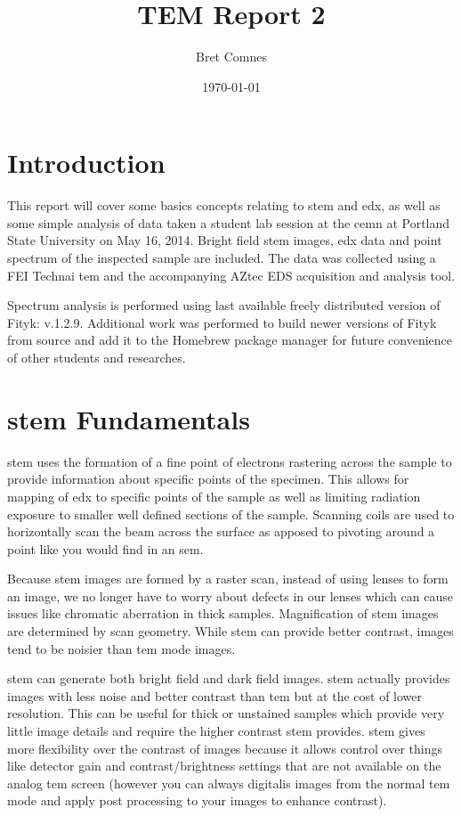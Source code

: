 \documentclass[12pt,a4paper]{article}
\title{TEM Report 2}
\author{Bret Comnes}
\date{\today}
\begin{document}
\maketitle

\section{Introduction} %

This report will cover some basics concepts relating to \ac{stem} and \ac{edx}, as well as some simple analysis of data taken a student lab session at the \ac{cemn} at Portland State University on May 16, 2014.  Bright field \ac{stem} images, \ac{edx} data and point spectrum of the inspected sample are included.  The data was collected using a FEI Technai \ac{tem} and the accompanying AZtec EDS acquisition and analysis tool.

Spectrum analysis is performed using last available freely distributed version of Fityk\cite{ft}: v.1.2.9.  Additional work was performed to build newer versions of Fityk from source and add it to the Homebrew\cite{home} package manager for future convenience of other students and researches.


\section{\ac{stem} Fundamentals} %
\label{sec:stem}

\ac{stem} uses the formation of a fine point of electrons rastering across the sample to provide information about specific points of the specimen.  This allows for mapping of \ac{edx} to specific points of the sample as well as limiting radiation exposure to smaller well defined sections of the sample.  Scanning coils are used to horizontally scan the beam across the surface as apposed to pivoting around a point like you would find in an \ac{sem}.

Because \ac{stem} images are formed by a raster scan, instead of using lenses to form an image, we no longer have to worry about defects in our lenses which can cause issues like chromatic aberration in thick samples.  Magnification of \ac{stem} images are determined by scan geometry.  While \ac{stem} can provide better contrast, images tend to be noisier than \ac{tem} mode images.  \cite{tem}  

\ac{stem} can generate both bright field and dark field images.  \ac{stem} actually provides images with less noise and better contrast than \ac{tem} but at the cost of lower resolution.  This can be useful for thick or unstained samples which provide very little image details and require the higher contrast \ac{stem} provides.  \ac{stem} gives more flexibility over the contrast of images because it allows control over things like detector gain and contrast/brightness settings that are not available on the analog \ac{tem} screen  (however you can always digitalis images from the normal \ac{tem} mode and apply post processing to your images to enhance contrast).  
\end{document}

